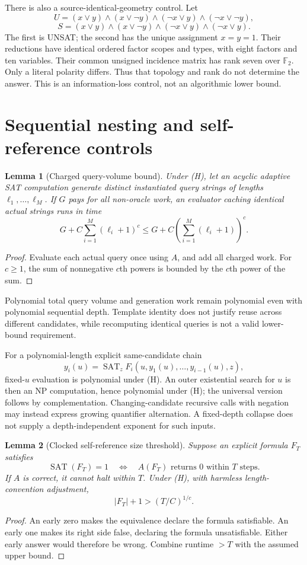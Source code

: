 \documentclass[11pt]{article}
\newtheorem{lemma}{Lemma}
\newcommand{\SAT}{\operatorname{SAT}}
\begin{document}
There is also a source-identical-geometry control. Let
\[
 U=(x\lor y)\land(x\lor\neg y)\land(\neg x\lor y)\land(\neg x\lor\neg y),
\]
\[
 S=(x\lor y)\land(x\lor\neg y)\land(\neg x\lor y)\land(\neg x\lor y).
\]
The first is UNSAT; the second has the unique assignment $x=y=1$.
Their reductions have identical ordered factor scopes and types, with
eight factors and ten variables. Their common unsigned incidence matrix
has rank seven over $\mathbb F_2$. Only a literal polarity differs.
Thus that topology and rank do not determine the answer.
This is an information-loss control, not an algorithmic lower bound.

\section{Sequential nesting and self-reference controls}
\begin{lemma}[Charged query-volume bound]
Under (H), let an acyclic adaptive SAT computation generate distinct
instantiated query strings of lengths $\ell_1,\ldots,\ell_M$.
If $G$ pays for all non-oracle work, an evaluator caching identical actual
strings runs in time
\[
 G+C\sum_{i=1}^{M}(\ell_i+1)^c
 \le G+C\left(\sum_{i=1}^{M}(\ell_i+1)\right)^c.
 \tag{7}
\]
\end{lemma}
\begin{proof}
Evaluate each actual query once using $A$, and add all charged work.
For $c\ge1$, the sum of nonnegative $c$th powers is bounded by the $c$th
power of the sum.
\end{proof}

Polynomial total query volume and generation work remain polynomial even
with polynomial sequential depth. Template identity does not justify reuse
across different candidates, while recomputing identical queries is not a
valid lower-bound requirement.

For a polynomial-length explicit same-candidate chain
\[
 y_i(u)=\SAT_z F_i(u,y_1(u),\ldots,y_{i-1}(u),z),
\]
fixed-$u$ evaluation is polynomial under (H). An outer existential search for
$u$ is then an NP computation, hence polynomial under (H); the universal
version follows by complementation. Changing-candidate recursive calls with
negation may instead express growing quantifier alternation. A fixed-depth
collapse does not supply a depth-independent exponent for such inputs.

\begin{lemma}[Clocked self-reference size threshold]
Suppose an explicit formula $F_T$ satisfies
\[
 \SAT(F_T)=1
 \quad\Longleftrightarrow\quad
 A(F_T)\text{ returns }0\text{ within }T\text{ steps}.
\]
If $A$ is correct, it cannot halt within $T$. Under (H), with harmless
length-convention adjustment,
\[
 |F_T|+1>(T/C)^{1/c}.
 \tag{8}
\]
\end{lemma}
\begin{proof}
An early zero makes the equivalence declare the formula satisfiable.
An early one makes its right side false, declaring the formula
unsatisfiable. Either early answer would therefore be wrong.
Combine runtime $>T$ with the assumed upper bound.
\end{proof}
\end{document}

